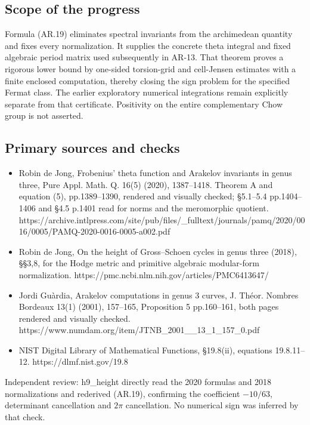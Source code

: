 \subsection{Scope of the progress}\label{scope-of-the-progress}

Formula (AR.19) eliminates spectral invariants from the archimedean
quantity and fixes every normalization. It supplies the concrete theta
integral and fixed algebraic period matrix used subsequently in AR-13.
That theorem proves a rigorous lower bound by one-sided torsion-grid and
cell-Jensen estimates with a finite enclosed computation, thereby
closing the sign problem for the specified Fermat class. The earlier
exploratory numerical integrations remain explicitly separate from that
certificate. Positivity on the entire complementary Chow group is not
asserted.

\subsection{Primary sources and
checks}\label{primary-sources-and-checks}

\begin{itemize}
\tightlist
\item
  Robin de Jong, Frobenius' theta function and Arakelov invariants in
  genus three, Pure Appl. Math. Q. 16(5) (2020), 1387--1418. Theorem A
  and equation (5), pp.1389--1390, rendered and visually checked;
  §5.1--5.4 pp.1404--1406 and §4.5 p.1401 read for norms and the
  meromorphic quotient.
  https://archive.intlpress.com/site/pub/files/\_fulltext/journals/pamq/2020/0016/0005/PAMQ-2020-0016-0005-a002.pdf
\item
  Robin de Jong, On the height of Gross--Schoen cycles in genus three
  (2018), §§3,8, for the Hodge metric and primitive algebraic
  modular-form normalization.
  https://pmc.ncbi.nlm.nih.gov/articles/PMC6413647/
\item
  Jordi Guàrdia, Arakelov computations in genus 3 curves, J. Théor.
  Nombres Bordeaux 13(1) (2001), 157--165, Proposition 5 pp.160--161,
  both pages rendered and visually checked.
  https://www.numdam.org/item/JTNB\_2001\_\_13\_1\_157\_0.pdf
\item
  NIST Digital Library of Mathematical Functions, §19.8(ii), equations
  19.8.11--12. https://dlmf.nist.gov/19.8
\end{itemize}

Independent review: h9\_height directly read the 2020 formulas and 2018
normalizations and rederived (AR.19), confirming the coefficient
\(-10/63\), determinant cancellation and \(2\pi\) cancellation. No
numerical sign was inferred by that check.

